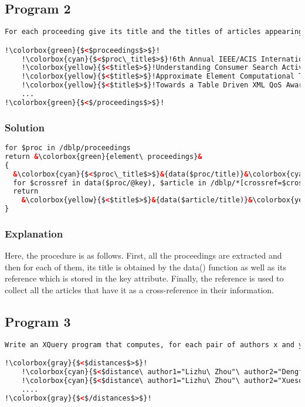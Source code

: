 \documentclass{article}
\begin{document}
\subsection{Program 2}
\begin{lstlisting}[language=xml, escapechar=!]
For each proceeding give its title and the titles of articles appearing in it, using the following output format.

!\colorbox{green}{$<$proceedings$>$}!
    !\colorbox{cyan}{$<$proc\_title$>$}!6th Annual IEEE/ACIS International Conference (...)!\colorbox{cyan}{$<$/proc\_title$>$}!
    !\colorbox{yellow}{$<$title$>$}!Understanding Consumer Search Activity and Online (...)!\colorbox{yellow}{$<$/title$>$}!
    !\colorbox{yellow}{$<$title$>$}!Approximate Element Computational Time for Domain (...)!\colorbox{yellow}{$<$/title$>$}!
    !\colorbox{yellow}{$<$title$>$}!Towards a Table Driven XML QoS Aware Transmission Framework.!\colorbox{yellow}{$<$/title$>$}!
    ...
!\colorbox{green}{$<$/proceedings$>$}!
\end{lstlisting}

\subsubsection{Solution}
\begin{lstlisting}[language=xml, frame=none, escapechar=&]
for $proc in /dblp/proceedings
return &\colorbox{green}{element\ proceedings}&
{
  &\colorbox{cyan}{$<$proc\_title$>$}&{data($proc/title)}&\colorbox{cyan}{$<$/proc\_title$>$}&,
  for $crossref in data($proc/@key), $article in /dblp/*[crossref=$crossref]
  return
    &\colorbox{yellow}{$<$title$>$}&{data($article/title)}&\colorbox{yellow}{$<$/title$>$}&
}
\end{lstlisting}

\subsubsection{Explanation}
Here, the procedure is as follows. First, all the proceedings are extracted and then for each of them, its title is obtained by the data() function as well as its reference which is stored in the key attribute. Finally, the reference is used to collect all the articles that have it as a cross-reference in their information.

\subsection{Program 3}
\begin{lstlisting}[language=xml, escapechar=!]
Write an XQuery program that computes, for each pair of authors x and y !$\ne$! x the distance between x and y using the following output format.

!\colorbox{gray}{$<$distances$>$}!
    !\colorbox{cyan}{$<$distance\ author1="Lizhu\ Zhou"\ author2="Dengfeng\ Zhang"\ distance="3"/$>$}!
    !\colorbox{cyan}{$<$distance\ author1="Lizhu\ Zhou"\ author2="Xuesong\ Yan"\ distance="2"/$>$}!
    ....
!\colorbox{gray}{$<$/distances$>$}!
\end{lstlisting}
\end{document}
